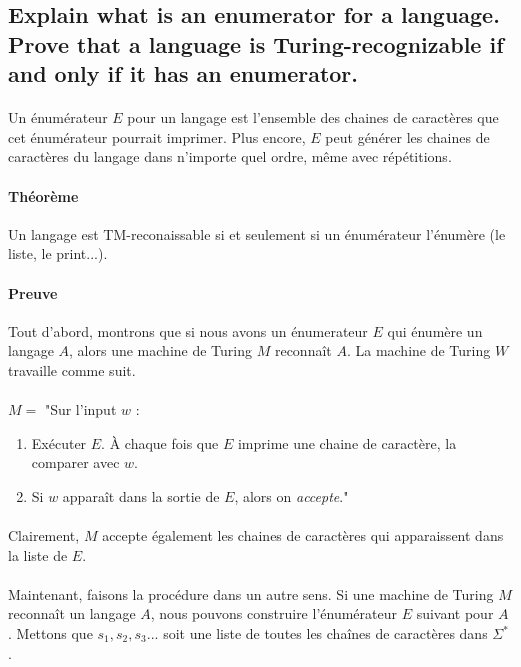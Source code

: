 \subsection{Explain what is an enumerator for a language. Prove that a language is Turing-recognizable if and only if it has an enumerator.}
\paragraph{}
Un énumérateur $E$ pour un langage est l'ensemble des chaines de caractères que cet énumérateur pourrait imprimer. Plus encore, $E$ peut générer les chaines de caractères du langage dans n'importe quel ordre, même avec répétitions.

\paragraph{Théorème} Un langage est TM-reconaissable si et seulement si un énumérateur l'énumère (le liste, le print...).
\paragraph{Preuve} Tout d'abord, montrons que si nous avons un énumerateur $E$ qui énumère un langage $A$, alors une machine de Turing $M$ reconnaît $A$. La machine de Turing $W$ travaille comme suit.

\paragraph{}
$M = $ "Sur l'input $w$ :
\begin{enumerate}
\item Exécuter $E$. À chaque fois que $E$ imprime une chaine de caractère, la comparer avec $w$.
\item Si $w$ apparaît dans la sortie de $E$, alors on \textit{accepte}."
\end{enumerate}

\paragraph{}
Clairement, $M$ accepte également les chaines de caractères qui apparaissent dans la liste de $E$.

\paragraph{}
Maintenant, faisons la procédure dans un autre sens. Si une machine de Turing $M$ reconnaît un langage $A$, nous pouvons construire l'énumérateur $E$ suivant pour $A$. Mettons que $s_{1}, s_{2}, s_{3}...$ soit une liste de toutes les chaînes de caractères dans $\Sigma^{*}$.


